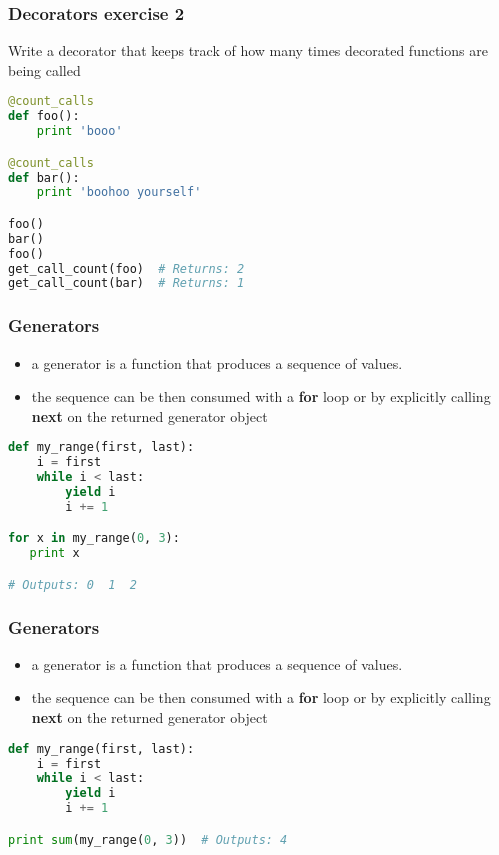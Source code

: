 \documentclass{beamer}
\begin{document}
\begin{frame}[fragile]
\frametitle{Decorators exercise 2}

Write a decorator that keeps track of how many times decorated functions are being called

\vspace{5 mm}

\begin{lstlisting}[language=python]
@count_calls
def foo():
    print 'booo'

@count_calls
def bar():
    print 'boohoo yourself'

foo()
bar()
foo()
get_call_count(foo)  # Returns: 2
get_call_count(bar)  # Returns: 1
\end{lstlisting}

\end{frame}


\begin{frame}[fragile]
\frametitle{Generators}
\begin{itemize}
  \item a generator is a function that produces a sequence of values.
  \item the sequence can be then consumed with a {\bf for} loop or by explicitly
    calling {\bf next} on the returned generator object
\end{itemize}
\vspace{5 mm}
\pause
\begin{lstlisting}[language=python]
def my_range(first, last):
    i = first
    while i < last:
        yield i
        i += 1

for x in my_range(0, 3):
   print x

# Outputs: 0  1  2
\end{lstlisting}
\end{frame}

\begin{frame}[fragile]
\frametitle{Generators}
\begin{itemize}
  \item a generator is a function that produces a sequence of values.
  \item the sequence can be then consumed with a {\bf for} loop or by explicitly
    calling {\bf next} on the returned generator object
\end{itemize}
\vspace{5 mm}
\begin{lstlisting}[language=python]
def my_range(first, last):
    i = first
    while i < last:
        yield i
        i += 1

print sum(my_range(0, 3))  # Outputs: 4
\end{lstlisting}
\end{frame}
\end{document}
